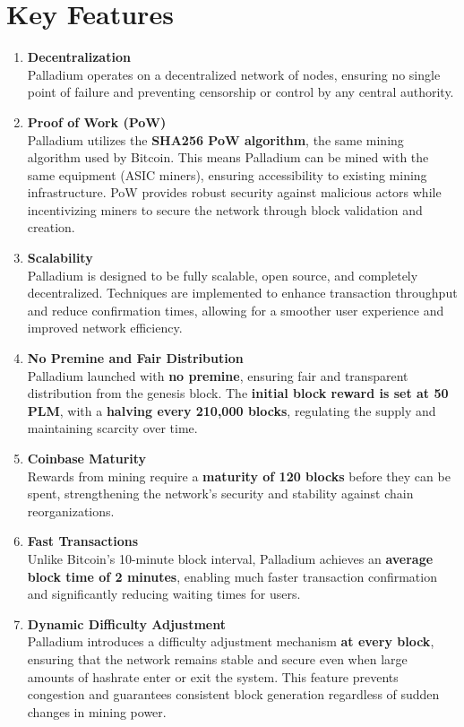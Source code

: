 \documentclass[11pt,a4paper]{article}
\begin{document}
\section{Key Features}
\begin{enumerate}
    \item \textbf{Decentralization} \\ 
    Palladium operates on a decentralized network of nodes, ensuring no single point of failure and preventing censorship or control by any central authority.

    \item \textbf{Proof of Work (PoW)} \\ 
    Palladium utilizes the \textbf{SHA256 PoW algorithm}, the same mining algorithm used by Bitcoin. This means Palladium can be mined with the same equipment (ASIC miners), ensuring accessibility to existing mining infrastructure. PoW provides robust security against malicious actors while incentivizing miners to secure the network through block validation and creation.

    \item \textbf{Scalability} \\ 
    Palladium is designed to be fully scalable, open source, and completely decentralized. Techniques are implemented to enhance transaction throughput and reduce confirmation times, allowing for a smoother user experience and improved network efficiency.

    \item \textbf{No Premine and Fair Distribution} \\ 
    Palladium launched with \textbf{no premine}, ensuring fair and transparent distribution from the genesis block. The \textbf{initial block reward is set at 50 PLM}, with a \textbf{halving every 210,000 blocks}, regulating the supply and maintaining scarcity over time.

    \item \textbf{Coinbase Maturity} \\ 
    Rewards from mining require a \textbf{maturity of 120 blocks} before they can be spent, strengthening the network’s security and stability against chain reorganizations.

    \item \textbf{Fast Transactions} \\ 
    Unlike Bitcoin’s 10-minute block interval, Palladium achieves an \textbf{average block time of 2 minutes}, enabling much faster transaction confirmation and significantly reducing waiting times for users.

    \item \textbf{Dynamic Difficulty Adjustment} \\ 
    Palladium introduces a difficulty adjustment mechanism \textbf{at every block}, ensuring that the network remains stable and secure even when large amounts of hashrate enter or exit the system. This feature prevents congestion and guarantees consistent block generation regardless of sudden changes in mining power.
\end{enumerate}
\end{document}
